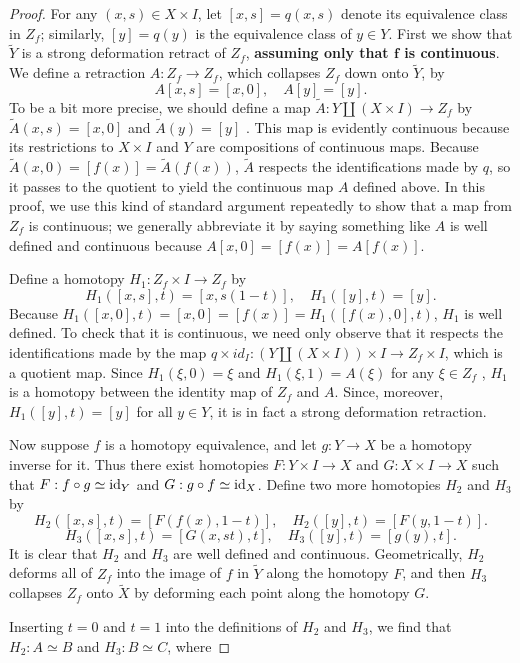 \begin{proof}
For any $(x,s)\in X\times I$, let $[x,s]=q(x,s)$ denote its equivalence class in $Z_f$; similarly, $[y]=q(y)$ is the equivalence class of $y\in Y$.
First we show that $\widetilde{Y}$ is a strong deformation retract of $Z_f$, \textbf{assuming only that $\bm{f}$ is continuous}. We define a retraction $A:Z_f\to Z_f$, which collapses $Z_f$ down onto $\widetilde{Y}$, by
\[A[x,s]=[x,0],\quad A[y]=[y].\]
To be a bit more precise, we should define a map $\widetilde{A}: Y\amalg(X\times I)\to Z_f$ by $\widetilde{A}(x,s)=[x,0]$ and $\widetilde{A}(y)=[y]$ . This map is evidently continuous because its restrictions to $X\times I$ and $Y$ are compositions of continuous maps. Because $\widetilde{A}(x,0)=[f(x)]=\widetilde{A}(f(x))$, $\widetilde{A}$ respects the identifications made by $q$, so it passes to the quotient to yield the continuous map $A$ defined above. In this proof, we use this kind
of standard argument repeatedly to show that a map from $Z_f$ is continuous; we
generally abbreviate it by saying something like $A$ is well defined and continuous because $A[x,0]=[f(x)]=A[f(x)]$.\par
Define a homotopy $H_1:Z_f\times I\to Z_f$ by
\[H_1([x,s],t)=[x,s(1-t)],\quad H_1([y],t)=[y].\]
Because $H_1([x,0],t)=[x,0]=[f(x)]=H_1([f(x),0],t)$, $H_1$ is well defined. To
check that it is continuous, we need only observe that it respects the identifications made by the map $q\times id_I:(Y\amalg(X\times I))\times I\to Z_f\times I$, which is a quotient map. Since $H_1(\xi,0)=\xi$ and $H_1(\xi,1)=A(\xi)$ for any $\xi\in Z_f$ , $H_1$ is a homotopy between the identity map of $Z_f$ and $A$. Since, moreover, $H_1([y],t)=[y]$ for all $y\in Y$, it is in fact a strong deformation retraction.\par
Now suppose $f$ is a homotopy equivalence, and let $g:Y\to X$ be a homotopy
inverse for it. Thus there exist homotopies $F:Y\times I\to X$ and $G:X\times I\to X$ such that $F:f\circ g\simeq\mathrm{id}_Y$ and $G:g\circ f\simeq\mathrm{id}_X$. Define two more 
homotopies $H_2$ and $H_3$ by
\[H_2([x,s],t)=[F(f(x),1-t)],\quad H_2([y],t)=[F(y,1-t)].\]
\[H_3([x,s],t)=[G(x,st),t],\quad H_3([y],t)=[g(y),t].\]
It is clear that $H_2$ and $H_3$ are well defined and continuous. Geometrically, $H_2$ deforms all of $Z_f$ into the image of $f$ in $\widetilde{Y}$ along the homotopy $F$, and then $H_3$ collapses $Z_f$ onto $\widetilde{X}$ by deforming each point along the homotopy $G$.\par
Inserting $t=0$ and $t=1$ into the definitions of $H_2$ and $H_3$, we find that $H_2:A\simeq B$ and $H_3:B\simeq C$, where

\end{proof}
